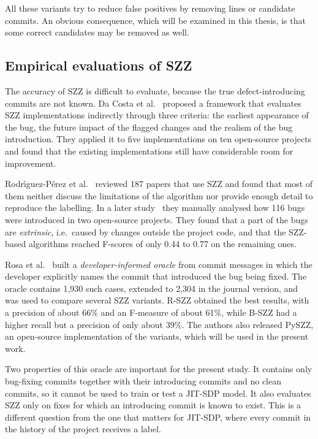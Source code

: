 \documentclass[12pt,a4paper,oneside]{report}
\begin{document}
All these variants try to reduce false positives by removing lines or
candidate commits. An obvious consequence, which will be examined in this
thesis, is that some correct candidates may be removed as well.

\subsection{Empirical evaluations of SZZ}

The accuracy of SZZ is difficult to evaluate, because the true
defect-introducing commits are not known. Da Costa et
al.~\cite{dacosta2017maszz} proposed a framework that evaluates SZZ
implementations indirectly through three criteria: the earliest appearance of
the bug, the future impact of the flagged changes and the realism of the bug
introduction. They applied it to five implementations on ten open-source
projects and found that the existing implementations still have considerable
room for improvement.

Rodr\'{\i}guez-P\'{e}rez et al.~\cite{rodriguez2018szz} reviewed 187 papers
that use SZZ and found that most of them neither discuss the limitations of
the algorithm nor provide enough detail to reproduce the labelling. In a later
study~\cite{rodriguez2020bugs} they manually analysed how 116 bugs were
introduced in two open-source projects. They found that a part of the bugs
are \emph{extrinsic}, i.e.\ caused by changes outside the project code, and
that the SZZ-based algorithms reached F-scores of only 0.44 to 0.77 on the
remaining ones.

Rosa et al.~\cite{rosa2021oracle,rosa2023szzvariants} built a
\emph{developer-informed oracle} from commit messages in which the developer
explicitly names the commit that introduced the bug being fixed. The oracle
contains 1,930 such cases, extended to 2,304 in the journal version, and was
used to compare several SZZ variants. R-SZZ obtained the best results, with a
precision of about 66\% and an F-measure of about 61\%, while B-SZZ had a
higher recall but a precision of only about 39\%. The authors also released
PySZZ, an open-source implementation of the variants, which will be used in
the present work.

Two properties of this oracle are important for the present study. It
contains only bug-fixing commits together with their introducing commits and
no clean commits, so it cannot be used to train or test a JIT-SDP model. It
also evaluates SZZ only on fixes for which an introducing commit is known to
exist. This is a different question from the one that matters for JIT-SDP,
where every commit in the history of the project receives a label.
\end{document}
